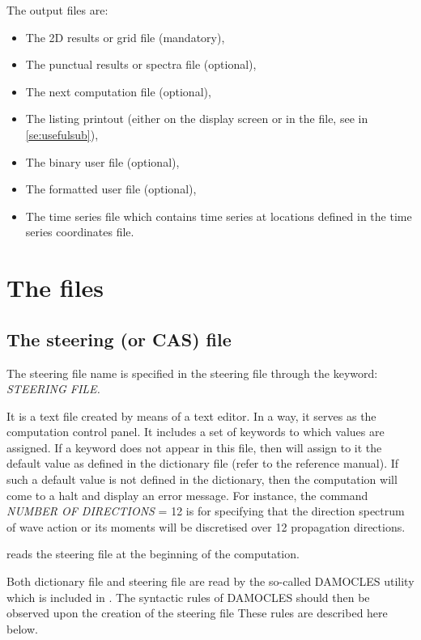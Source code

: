 The output files are:

\begin{itemize}
\item  The 2D results or grid file (mandatory),
\item  The punctual results or spectra file (optional),
\item  The next computation file (optional),
\item  The listing printout (either on the display screen or in the file, see in
  \ref{se:usefulsub}),
\item  The binary user file (optional),
\item  The formatted user file (optional),
\item  The time series file which contains time series at locations defined in
  the time series coordinates file.
\end{itemize}

\section{ The files}

\subsection{ The steering (or CAS) file}
\label{se:steeringfile}
The steering file name is specified in the steering file through the keyword:
\textit{STEERING FILE.}

It is a text file created by means of a text editor. In a way, it serves as the
computation control panel. It includes a set of keywords to which values are assigned.
If a keyword does not appear in this file, then \tomawac will assign to it the default
value as defined in the dictionary file (refer to the reference manual). If such a
default value is not defined in the dictionary, then the computation will come to a
halt and display an error message. For instance, the command \textit{NUMBER OF
  DIRECTIONS} = 12 is for specifying that the direction spectrum of wave action or its
moments will be discretised over 12 propagation directions.

 \tomawac reads the steering file at the beginning of the computation.

 Both dictionary file and steering file are read by the so-called DAMOCLES utility which
 is included in \tomawac. The syntactic rules of DAMOCLES should then be observed upon
 the creation of the steering file These rules are described here below.

